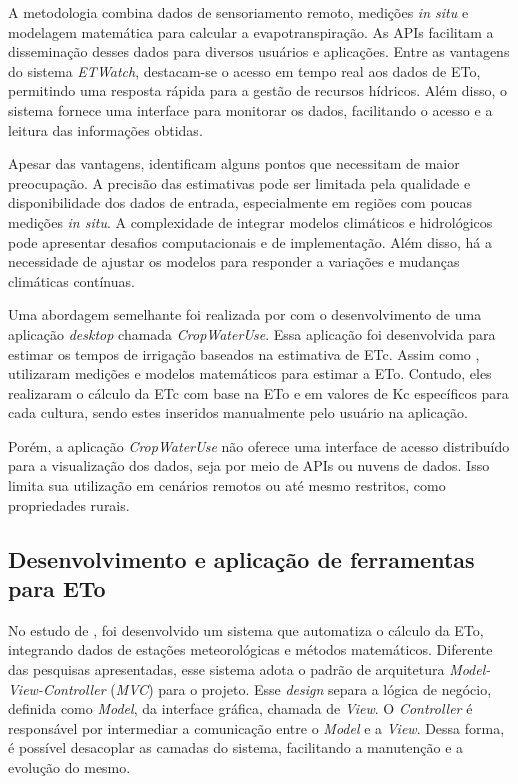 A metodologia combina dados de sensoriamento remoto, medições \textit{in situ} e modelagem matemática para calcular a evapotranspiração. As APIs facilitam a disseminação desses dados para diversos usuários e aplicações. Entre as vantagens do sistema \textit{ETWatch}, destacam-se o acesso em tempo real aos dados de ETo, permitindo uma resposta rápida para a gestão de recursos hídricos. Além disso, o sistema fornece uma interface para monitorar os dados, facilitando o acesso e a leitura das informações obtidas.

Apesar das vantagens, \textcite{Fangming_webeva2021} identificam alguns pontos que necessitam de maior preocupação. A precisão das estimativas pode ser limitada pela qualidade e disponibilidade dos dados de entrada, especialmente em regiões com poucas medições \textit{in situ}. A complexidade de integrar modelos climáticos e hidrológicos pode apresentar desafios computacionais e de implementação. Além disso, há a necessidade de ajustar os modelos para responder a variações e mudanças climáticas contínuas.

Uma abordagem semelhante foi realizada por \textcite{Jose_webeva2011} com o desenvolvimento de uma aplicação \textit{desktop} chamada \textit{CropWaterUse}. Essa aplicação foi desenvolvida para estimar os tempos de irrigação baseados na estimativa de ETc. Assim como \textcite{Fangming_webeva2021}, \textcite{Jose_webeva2011} utilizaram medições e modelos matemáticos para estimar a ETo. Contudo, eles realizaram o cálculo da ETc com base na ETo e em valores de Kc específicos para cada cultura, sendo estes inseridos manualmente pelo usuário na aplicação.

Porém, a aplicação \textit{CropWaterUse} não oferece uma interface de acesso distribuído para a visualização dos dados, seja por meio de APIs ou nuvens de dados. Isso limita sua utilização em cenários remotos ou até mesmo restritos, como propriedades rurais.

\subsection{Desenvolvimento e aplicação de ferramentas para ETo}
No estudo de \textcite{Taison_webeva2019}, foi desenvolvido um sistema que automatiza o cálculo da ETo, integrando dados de estações meteorológicas e métodos matemáticos. Diferente das pesquisas apresentadas, esse sistema adota o padrão de arquitetura \textit{Model-View-Controller} (\textit{MVC}) para o projeto. Esse \textit{design} separa a lógica de negócio, definida como \textit{Model}, da interface gráfica, chamada de \textit{View}. O \textit{Controller} é responsável por intermediar a comunicação entre o \textit{Model} e a \textit{View}. Dessa forma, é possível desacoplar as camadas do sistema, facilitando a manutenção e a evolução do mesmo.

